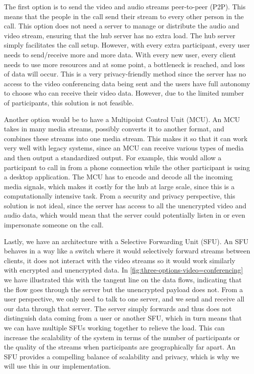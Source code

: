 \documentclass{report}
\begin{document}
The first option is to send the video and audio streams peer-to-peer (P2P). This means that the people in
the call send their stream to every other person in the call. This option does not need a server to manage or
distribute the audio and video stream, ensuring that the hub server has no extra load. The hub server simply
facilitates the call setup. However, with every extra participant, every user needs to send/receive more and more
data. With every new user, every client needs to use more resources and at some point, a bottleneck is
reached, and loss of data will occur. This is a very privacy-friendly method since the server has no access to the
video conferencing data being sent and the users have full autonomy to choose who can receive their video data.
However, due to the limited number of participants, this solution is not feasible.

Another option would be to have a Multipoint Control Unit (MCU). An MCU takes in many media streams, possibly
converts it to another format, and combines these streams into one media stream. This makes it so that it can work
very well with legacy systems, since an MCU can receive various types of media and then output a standardized
output. For example, this would allow a participant to call in from a phone connection while the other participant
is using a desktop application. The MCU has to encode and decode all the incoming media signals, which makes it
costly for the hub at large scale, since this is a computationally intensive task. From a security and privacy
perspective, this solution is not ideal, since the server has access to all the unencrypted video and audio data,
which would mean that the server could potentially listen in or even impersonate someone on the call.

Lastly, we have an architecture with a Selective Forwarding Unit (SFU). An SFU behaves in a way like a switch where it
would selectively forward streams between clients, it does not interact with the video streams so it would work
similarly with encrypted and unencrypted data.  In \autoref{fig:three-options-video=conferencing} we have
illustrated this with the tangent line on the data flows, indicating that the flow goes through the server but
the unencrypted payload does not. From a user perspective, we only need to talk to one server, and we
send and receive all our data through that server.  The server simply forwards and thus does not distinguish data
coming from a user or another SFU, which in turn means that we can have multiple SFUs working together to relieve
the load. This can increase the scalability of the system in terms of the number of participants or the quality of the streams when
participants are geographically far apart. An SFU provides a compelling balance of scalability and privacy, which is
why we will use this in our implementation.
\end{document}
